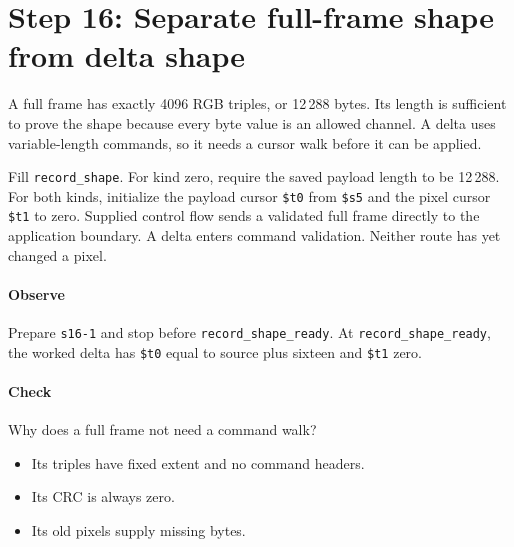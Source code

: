 \section{Step 16: Separate full-frame shape from delta shape}
A full frame has exactly 4096 RGB triples, or 12\,288 bytes. Its length is
sufficient to prove the shape because every byte value is an allowed channel.
A delta uses variable-length commands, so it needs a cursor walk before it can
be applied.

Fill \texttt{record\_shape}. For kind zero, require the saved payload length to
be 12\,288. For both kinds, initialize the payload cursor \texttt{\$t0} from
\texttt{\$s5} and the pixel cursor \texttt{\$t1} to zero. Supplied control
flow sends a validated full frame directly to the application boundary. A delta
enters command validation. Neither route has yet changed a pixel.

\paragraph{Observe} Prepare \texttt{s16-1} and stop before
\texttt{record\_shape\_ready}. At \texttt{record\_shape\_ready}, the worked delta has
\texttt{\$t0} equal to source plus sixteen and \texttt{\$t1} zero.

\paragraph{Check} Why does a full frame not need a command walk?
\begin{itemize}
  \item[A.] Its triples have fixed extent and no command headers.
  \item[B.] Its CRC is always zero.
  \item[C.] Its old pixels supply missing bytes.
\end{itemize}
